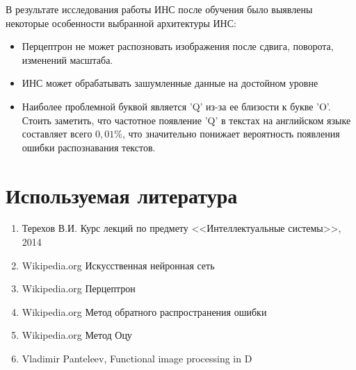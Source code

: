 \documentclass[russian,utf8,emptystyle]{eskdtext}
\begin{document}
В результате исследования работы ИНС после обучения было выявлены некоторые особенности выбранной архитектуры ИНС:
\begin{itemize}
\item Перцептрон не может распозновать изображения после сдвига, поворота, изменений масштаба.
\item ИНС может обрабатывать зашумленные данные на достойном уровне
\item Наиболее проблемной буквой является 'Q' из-за ее близости к букве 'O'. Стоить заметить, что частотное появление 'Q' в текстах на английском языке составляет всего $0,01\%$, что значительно понижает вероятность появления ошибки распознавания текстов.
\end{itemize}
\clearpage
\section{Используемая литература}
\renewcommand{\theenumi}{\arabic{enumi}}
\begin{enumerate}
\item Терехов В.И. Курс лекций по предмету <<Интеллектуальные системы>>, 2014
\item Wikipedia.org Искусственная нейронная сеть
\item Wikipedia.org Перцептрон
\item Wikipedia.org Метод обратного распространения ошибки
\item Wikipedia.org Метод Оцу
\item Vladimir Panteleev, Functional image processing in D
\end{enumerate}
\end{document}
